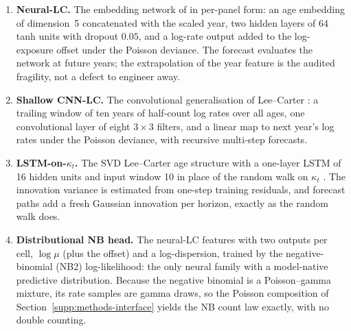 \begin{enumerate}
  $\mathrm{RBF}(\text{year})\otimes\mathrm{ICM}(\text{rank }5)$, a Gaussian
  likelihood on the half-count log rate with a Poisson-level noise floor, and
  training by exact marginal likelihood on the trailing block of complete
  years, the Kronecker structure requiring a complete year-by-age block. Its
  native predictive is the joint posterior over the $h$ future years. The
  window is at least forty years and---by Addendum~4---at most sixty. The
  lower bound is an identification constraint rather than a convention: the
  separable age $\times$ time kernel is fitted by exact marginal likelihood,
  and on a short panel the time-kernel length-scale is not identified against
  the nugget, so the fit can trade smoothness for noise without changing the
  likelihood materially. That is the floor which removes CHL, HKG, HRV and KOR
  from every GP cell.
\item \textbf{Neural-LC.} The embedding network of \citet{richman2021neural}
  in per-panel form: an age embedding of dimension~5 concatenated with the
  scaled year, two hidden layers of 64 tanh units with dropout $0.05$, and a
  log-rate output added to the log-exposure offset under the Poisson deviance.
  The forecast evaluates the network at future years; the extrapolation of the
  year feature is the audited fragility, not a defect to engineer away.
\item \textbf{Shallow CNN-LC.} The convolutional generalisation of
  Lee--Carter \citep{perla2021time}: a trailing window of ten years of
  half-count log rates over all ages, one convolutional layer of eight
  $3\times3$ filters, and a linear map to next year's log rates under the
  Poisson deviance, with recursive multi-step forecasts.
\item \textbf{LSTM-on-$\kappa_t$.} The SVD Lee--Carter age structure with a
  one-layer LSTM of 16 hidden units and input window 10 in place of the random
  walk on $\kappa_t$ \citep{nigri2019deep}. The innovation variance is
  estimated from one-step training residuals, and forecast paths add a fresh
  Gaussian innovation per horizon, exactly as the random walk does.
\item \textbf{Distributional NB head.} The neural-LC features with two outputs
  per cell, $\log\mu$ (plus the offset) and a log-dispersion, trained by the
  negative-binomial (NB2) log-likelihood: the only neural family with a
  model-native predictive distribution. Because the negative binomial is a
  Poisson--gamma mixture, its rate samples are gamma draws, so the Poisson
  composition of Section~\ref{supp:methods-interface} yields the NB count law
  exactly, with no double counting.
\end{enumerate}

